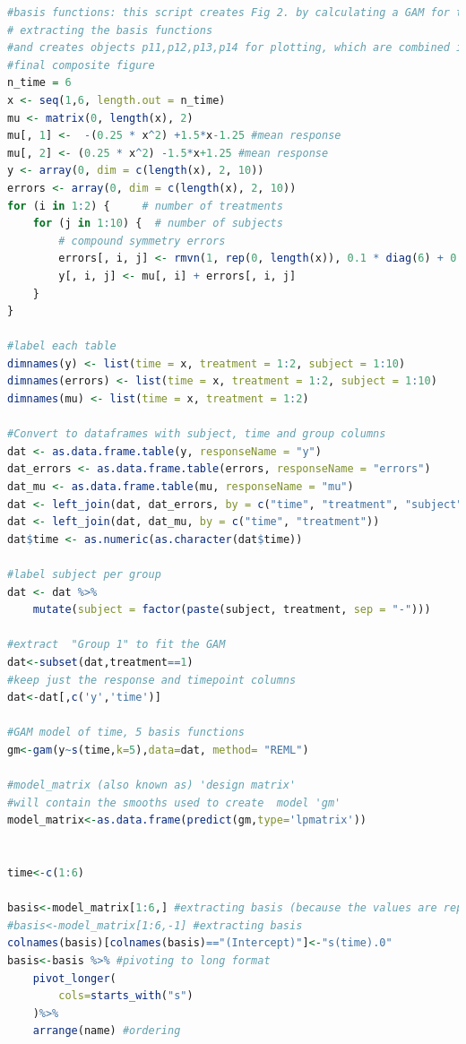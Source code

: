 \documentclass[
]{article}
\begin{document}
\begin{lstlisting}[language=R]
#basis functions: this script creates Fig 2. by calculating a GAM for the Group 1 data of Figure 1,
# extracting the basis functions
#and creates objects p11,p12,p13,p14 for plotting, which are combined in b_plot to create the
#final composite figure
n_time = 6
x <- seq(1,6, length.out = n_time)
mu <- matrix(0, length(x), 2)
mu[, 1] <-  -(0.25 * x^2) +1.5*x-1.25 #mean response
mu[, 2] <- (0.25 * x^2) -1.5*x+1.25 #mean response
y <- array(0, dim = c(length(x), 2, 10))
errors <- array(0, dim = c(length(x), 2, 10))
for (i in 1:2) {     # number of treatments
    for (j in 1:10) {  # number of subjects
        # compound symmetry errors
        errors[, i, j] <- rmvn(1, rep(0, length(x)), 0.1 * diag(6) + 0.25 * matrix(1, 6, 6))
        y[, i, j] <- mu[, i] + errors[, i, j]
    }
}

#label each table
dimnames(y) <- list(time = x, treatment = 1:2, subject = 1:10)
dimnames(errors) <- list(time = x, treatment = 1:2, subject = 1:10)
dimnames(mu) <- list(time = x, treatment = 1:2)

#Convert to dataframes with subject, time and group columns
dat <- as.data.frame.table(y, responseName = "y")
dat_errors <- as.data.frame.table(errors, responseName = "errors")
dat_mu <- as.data.frame.table(mu, responseName = "mu")
dat <- left_join(dat, dat_errors, by = c("time", "treatment", "subject"))
dat <- left_join(dat, dat_mu, by = c("time", "treatment"))
dat$time <- as.numeric(as.character(dat$time))

#label subject per group
dat <- dat %>%
    mutate(subject = factor(paste(subject, treatment, sep = "-")))

#extract  "Group 1" to fit the GAM
dat<-subset(dat,treatment==1)
#keep just the response and timepoint columns
dat<-dat[,c('y','time')]

#GAM model of time, 5 basis functions
gm<-gam(y~s(time,k=5),data=dat, method= "REML")

#model_matrix (also known as) 'design matrix'
#will contain the smooths used to create  model 'gm'
model_matrix<-as.data.frame(predict(gm,type='lpmatrix'))


time<-c(1:6)

basis<-model_matrix[1:6,] #extracting basis (because the values are repeated after every 6 rows)
#basis<-model_matrix[1:6,-1] #extracting basis
colnames(basis)[colnames(basis)=="(Intercept)"]<-"s(time).0"
basis<-basis %>% #pivoting to long format
    pivot_longer(
        cols=starts_with("s")
    )%>%
    arrange(name) #ordering


\end{lstlisting}
\end{document}
